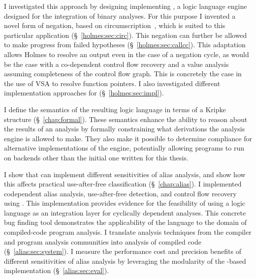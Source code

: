 I investigated this approach by designing implementing \sysname, a logic language engine designed for the integration of binary analyses.
For this purpose I invented a novel form of negation, based on circumscription~\cite{circumscription}, which is suited to this particular application (\S~\ref{holmes:sec:circ}).
This negation can further be allowed to make progress from failed hypotheses (\S~\ref{holmes:sec:callcc}).
This adaptation allows Holmes to resolve an output even in the case of a negation cycle, as would be the case with a co-dependent control flow recovery and a value analysis assuming completeness of the control flow graph.
This is concretely the case in the use of VSA to resolve function pointers.
I also investigated different implementation approaches for \sysname (\S~\ref{holmes:sec:impl}).

I define the semantics of the resulting logic language in terms of a Kripke structure (\S~\ref{chap:formal}).
These semantics enhance the ability to reason about the results of an analysis by formally constraining what derivations the analysis engine is allowed to make.
They also make it possible to determine compliance for alternative implementations of the engine, potentially allowing programs to run on backends other than the initial one written for this thesis.

I show that \sysname can implement different sensitivities of alias analysis, and show how this affects practical use-after-free classification (\S~\ref{chap:alias}).
I implemented codependent alias analysis, use-after-free detection, and control flow recovery using \sysname.
This implementation provides evidence for the feasibility of using a logic language as an integration layer for cyclically dependent analyses.
This concrete bug finding tool demonstrates the applicability of the \sysname language to the domain of compiled-code program analysis.
I translate analysis techniques from the compiler and program analysis communities into analysis of compiled code (\S~\ref{alias:sec:system}).
I measure the performance cost and precision benefits of different sensitivities of alias analysis by leveraging the modularity of the \sysname-based implementation (\S~\ref{alias:sec:eval}).

